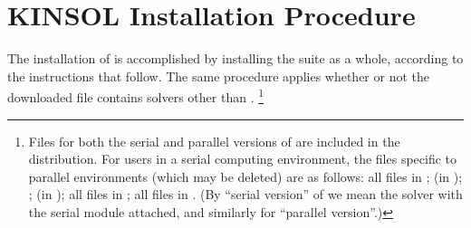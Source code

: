 \chapter{KINSOL Installation Procedure}\label{s:install}

The installation of {\kinsol} is accomplished by installing the
{\sundials} suite as a whole, according to the instructions that
follow.   The same procedure applies whether or not the downloaded
file contains solvers other than {\kinsol}. \footnote{Files for both
the serial and parallel versions of {\kinsol} are included in the
distribution. For users in a serial computing environment, the files
specific to parallel environments (which may be deleted) are as follows:
all files in ;
 (in );
;
 (in );
all files in ;
all files in .
(By ``serial version'' of {\kinsol} we mean the {\kinsol} solver with the
serial {\nvector} module attached, and similarly for ``parallel version''.)}

